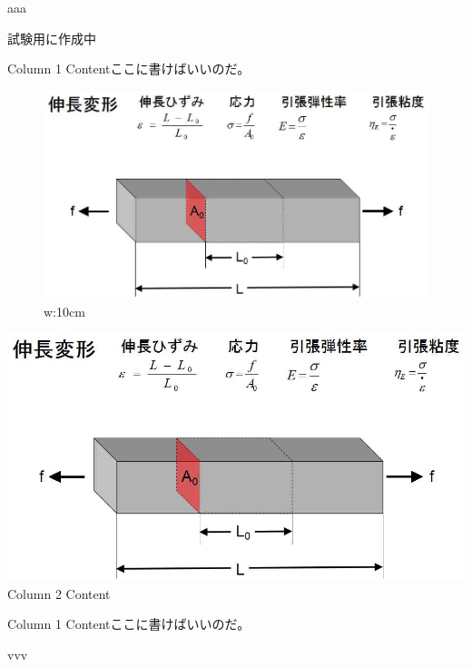 \begin{frame}

aaa

試験用に作成中

Column 1 Contentここに書けばいいのだ。

\begin{figure}
\centering
\includegraphics{単純な伸長変形のモデル.jpg}
\caption{w:10cm}
\end{figure}

\includegraphics{単純な伸長変形のモデル.jpg} Column 2 Content

Column 1 Contentここに書けばいいのだ。

vvv

\end{frame}

\begin{frame}

\end{frame}

